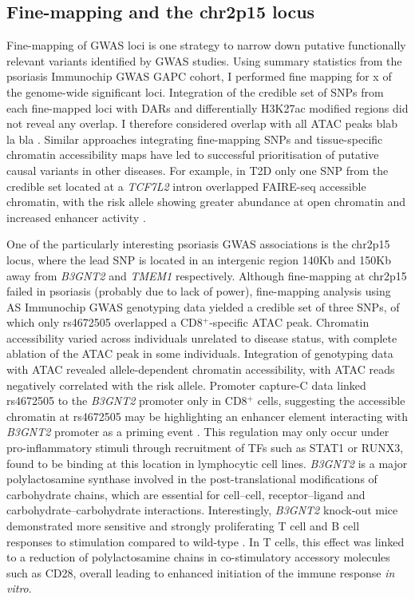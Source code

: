 \subsection{Fine-mapping and the chr2p15 locus}
Fine-mapping of GWAS loci is one strategy to narrow down putative functionally relevant variants identified by GWAS studies. Using summary statistics from the psoriasis Immunochip GWAS GAPC cohort, I performed fine mapping for x of the genome-wide significant loci. Integration of the credible set of SNPs from each fine-mapped loci with DARs and differentially H3K27ac modified regions did not reveal any overlap.  I therefore considered overlap with all ATAC peaks blab la bla . Similar approaches integrating fine-mapping SNPs and tissue-specific chromatin accessibility maps have led to successful prioritisation of putative causal variants in other diseases. For example, in T2D only one SNP from the credible set located at a \textit{TCF7L2} intron overlapped FAIRE-seq accessible chromatin, with the risk allele showing greater abundance at open chromatin and increased enhancer activity \parencite{Gaulton2010, Stefan2014}.

One of the particularly interesting psoriasis GWAS associations is the chr2p15 locus, where the lead SNP is located in an intergenic region 140Kb and 150Kb away from \textit{B3GNT2} and \textit{TMEM1} respectively. Although fine-mapping at chr2p15 failed in psoriasis (probably due to lack of power), fine-mapping analysis using AS Immunochip GWAS genotyping data yielded a credible set of three SNPs, of which only rs4672505 overlapped a CD8$^+$-specific ATAC peak. Chromatin accessibility varied across individuals unrelated to disease status, with complete ablation of the ATAC peak in some individuals. Integration of genotyping data with ATAC revealed allele-dependent chromatin accessibility, with ATAC reads negatively correlated with the risk allele. Promoter capture-C data linked rs4672505 to the \textit{B3GNT2} promoter only in CD8$^+$ cells, suggesting the accessible chromatin at rs4672505 may be highlighting an enhancer element interacting with \textit{B3GNT2} promoter as a priming event \parencite{Javiere2016}. This regulation may only occur under pro-inflammatory stimuli through recruitment of TFs such as STAT1 or RUNX3, found to be binding at this location in lymphocytic cell lines. \textit{B3GNT2} is a major polylactosamine synthase involved in the post-translational modifications of carbohydrate chains, which are essential for cell–cell, receptor–ligand and carbohydrate–carbohydrate interactions. Interestingly, \textit{B3GNT2} knock-out mice demonstrated more sensitive  and strongly proliferating T cell and B cell responses to stimulation compared to wild-type \parencite{Togayachi2010}. In T cells, this effect was linked to a reduction of polylactosamine chains in co-stimulatory accessory molecules such as CD28, overall leading to enhanced initiation of the immune response \textit{in vitro}. 


